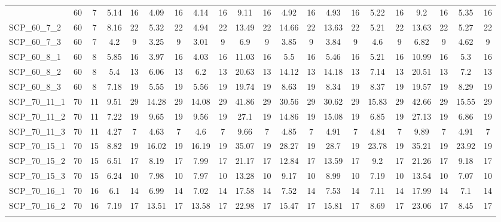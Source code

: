\begin{sidewaystable}[!ht]
{\begin{tabular}{lcccccccccccccccccccc}
{{SCP\_60\_7\_1 & 60 & 7 & 5.14 & 16 &  \textcolor{blue2}{4.09} & 16 & 4.14 & 16 & 9.11 & 16 & 4.92 & 16 & 4.93 & 16 & 5.22 & 16 & 9.2 & 16 & 5.35 & 16 \\
SCP\_60\_7\_2 & 60 & 7 & 8.16 & 22 & 5.32 & 22 &  \textcolor{blue2}{4.94} & 22 & 13.49 & 22 & 14.66 & 22 & 13.63 & 22 & 5.21 & 22 & 13.63 & 22 & 5.27 & 22 \\
SCP\_60\_7\_3 & 60 & 7 & 4.2 & 9 & 3.25 & 9 &  \textcolor{blue2}{3.01} & 9 & 6.9 & 9 & 3.85 & 9 & 3.84 & 9 & 4.6 & 9 & 6.82 & 9 & 4.62 & 9 \\
SCP\_60\_8\_1 & 60 & 8 & 5.85 & 16 &  \textcolor{blue2}{3.97} & 16 & 4.03 & 16 & 11.03 & 16 & 5.5 & 16 & 5.46 & 16 & 5.21 & 16 & 10.99 & 16 & 5.3 & 16 \\
SCP\_60\_8\_2 & 60 & 8 &  \textcolor{blue2}{5.4} & 13 & 6.06 & 13 & 6.2 & 13 & 20.63 & 13 & 14.12 & 13 & 14.18 & 13 & 7.14 & 13 & 20.51 & 13 & 7.2 & 13 \\
SCP\_60\_8\_3 & 60 & 8 & 7.18 & 19 &  \textcolor{blue2}{5.55} & 19 & 5.56 & 19 & 19.74 & 19 & 8.63 & 19 & 8.34 & 19 & 8.37 & 19 & 19.57 & 19 & 8.29 & 19 \\
SCP\_70\_11\_1 & 70 & 11 &  \textcolor{blue2}{9.51} & 29 & 14.28 & 29 & 14.08 & 29 & 41.86 & 29 & 30.56 & 29 & 30.62 & 29 & 15.83 & 29 & 42.66 & 29 & 15.55 & 29 \\
SCP\_70\_11\_2 & 70 & 11 & 7.22 & 19 & 9.65 & 19 & 9.56 & 19 & 27.1 & 19 & 14.86 & 19 & 15.08 & 19 &  \textcolor{blue2}{6.85} & 19 & 27.13 & 19 & 6.86 & 19 \\
SCP\_70\_11\_3 & 70 & 11 &  \textcolor{blue2}{4.27} & 7 & 4.63 & 7 & 4.6 & 7 & 9.66 & 7 & 4.85 & 7 & 4.91 & 7 & 4.84 & 7 & 9.89 & 7 & 4.91 & 7 \\
SCP\_70\_15\_1 & 70 & 15 &  \textcolor{blue2}{8.82} & 19 & 16.02 & 19 & 16.19 & 19 & 35.07 & 19 & 28.27 & 19 & 28.7 & 19 & 23.78 & 19 & 35.21 & 19 & 23.92 & 19 \\
SCP\_70\_15\_2 & 70 & 15 &  \textcolor{blue2}{6.51} & 17 & 8.19 & 17 & 7.99 & 17 & 21.17 & 17 & 12.84 & 17 & 13.59 & 17 & 9.2 & 17 & 21.26 & 17 & 9.18 & 17 \\
SCP\_70\_15\_3 & 70 & 15 &  \textcolor{blue2}{6.24} & 10 & 7.98 & 10 & 7.97 & 10 & 13.28 & 10 & 9.17 & 10 & 8.99 & 10 & 7.19 & 10 & 13.54 & 10 & 7.07 & 10 \\
SCP\_70\_16\_1 & 70 & 16 &  \textcolor{blue2}{6.1} & 14 & 6.99 & 14 & 7.02 & 14 & 17.58 & 14 & 7.52 & 14 & 7.53 & 14 & 7.11 & 14 & 17.99 & 14 & 7.1 & 14 \\
SCP\_70\_16\_2 & 70 & 16 &  \textcolor{blue2}{7.19} & 17 & 13.51 & 17 & 13.58 & 17 & 22.98 & 17 & 15.47 & 17 & 15.81 & 17 & 8.69 & 17 & 23.06 & 17 & 8.45 & 17 \\
}}
\end{tabular}}
\end{sidewaystable}
